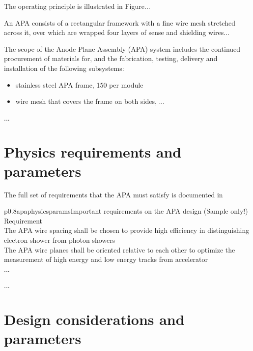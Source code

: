 The operating principle is illustrated in Figure...

An APA consists of a rectangular framework with a fine wire mesh stretched across it, over which are wrapped four layers of sense and shielding wires...

The scope of the Anode Plane Assembly (APA) system includes the continued procurement of materials for, and the fabrication, testing, delivery and installation of the following subsystems: 

\begin{itemize}
\item stainless steel APA frame, 150 per module 
\item wire mesh that covers the frame on both sides, ...
\end{itemize}
...
\section{Physics requirements and parameters}
\label{apa:req-param}

The full set of requirements that the APA must satisfy is documented in 

\begin{cdrtable}{p{0.8\textwidth}}{apaphysicsparams}{Important requirements on the APA design (Sample only!)}   
Requirement  \\ \toprowrule
 The APA wire spacing shall be chosen to provide high efficiency in distinguishing electron shower from photon showers \\ \colhline
 The APA wire planes shall be oriented relative to each other to optimize the measurement of high energy and low energy tracks from accelerator  \\ \colhline
 ...\\ 
\end{cdrtable}
...


\section{Design considerations and parameters}
\label{apa:design-consid}

